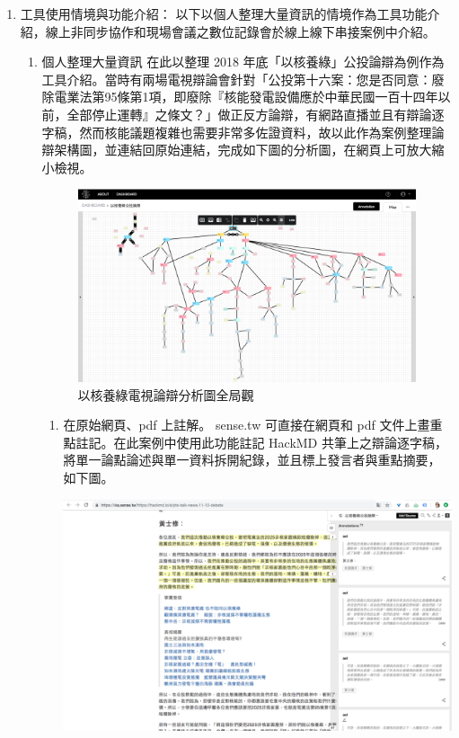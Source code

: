 \documentclass[12pt,a4paper]{article}
\begin{document}
\begin{enumerate}
\item 工具使用情境與功能介紹：
\label{sec:org37794ba}
以下以個人整理大量資訊的情境作為工具功能介紹，線上非同步協作和現場會議之數位記錄會於線上線下串接案例中介紹。
\begin{enumerate}
\item 個人整理大量資訊
\label{sec:org882cba4}
在此以整理 2018 年底「以核養綠」公投論辯為例作為工具介紹。當時有兩場電視辯論會針對「公投第十六案：您是否同意：廢除電業法第95條第1項，即廢除『核能發電設備應於中華民國一百十四年以前，全部停止運轉』之條文？」做正反方論辯，有網路直播並且有辯論逐字稿，然而核能議題複雜也需要非常多佐證資料，故以此作為案例整理論辯架構圖，並連結回原始連結，完成如下圖的分析圖，在網頁上可放大縮小檢視。

\begin{figure}[htbp]
\centering
\includegraphics[width=.9\linewidth]{./images/nuclear_whole_picture.png}
\caption{\label{fig:orgf95bf1f}
以核養綠電視論辯分析圖全局觀}
\end{figure}
\begin{enumerate}
\item 在原始網頁、pdf 上註解。
\label{sec:org4faaf48}
sense.tw 可直接在網頁和 pdf 文件上畫重點註記。在此案例中使用此功能註記 HackMD 共筆上之辯論逐字稿，將單一論點論述與單一資料拆開紀錄，並且標上發言者與重點摘要，如下圖。

\begin{center}
\includegraphics[width=.9\linewidth]{./images/nuclear_annotation_hackmd.png}
\end{center}


\end{enumerate}
\end{enumerate}
\end{enumerate}
\end{document}
